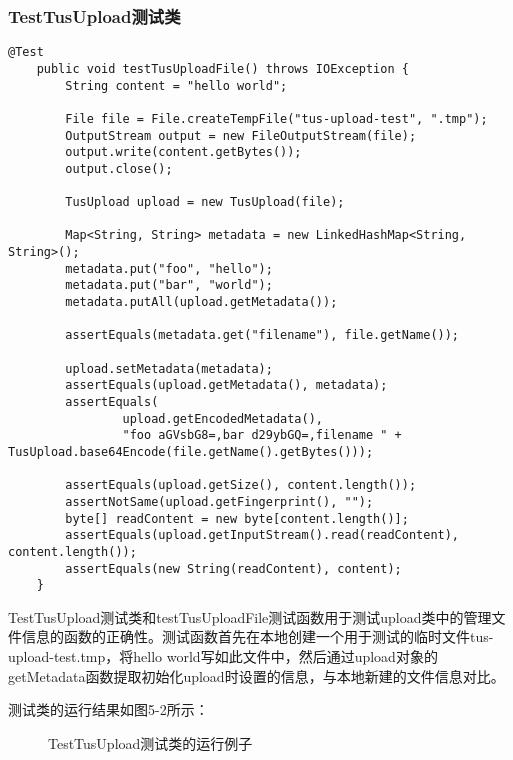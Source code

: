 \documentclass[bachelor]{thesis-uestc}
\begin{document}
\subsubsection{TestTusUpload测试类}
\begin{lstlisting}[title=testTusUploadFile测试函数]
    @Test
    public void testTusUploadFile() throws IOException {
        String content = "hello world";

        File file = File.createTempFile("tus-upload-test", ".tmp");
        OutputStream output = new FileOutputStream(file);
        output.write(content.getBytes());
        output.close();

        TusUpload upload = new TusUpload(file);

        Map<String, String> metadata = new LinkedHashMap<String, String>();
        metadata.put("foo", "hello");
        metadata.put("bar", "world");
        metadata.putAll(upload.getMetadata());

        assertEquals(metadata.get("filename"), file.getName());

        upload.setMetadata(metadata);
        assertEquals(upload.getMetadata(), metadata);
        assertEquals(
                upload.getEncodedMetadata(),
                "foo aGVsbG8=,bar d29ybGQ=,filename " + TusUpload.base64Encode(file.getName().getBytes()));

        assertEquals(upload.getSize(), content.length());
        assertNotSame(upload.getFingerprint(), "");
        byte[] readContent = new byte[content.length()];
        assertEquals(upload.getInputStream().read(readContent), content.length());
        assertEquals(new String(readContent), content);
	}
\end{lstlisting}
\par TestTusUpload测试类和testTusUploadFile测试函数用于测试upload类中的管理文件信息的函数的正确性。测试函数首先在本地创建一个用于测试的临时文件tus-upload-test.tmp，将hello world写如此文件中，然后通过upload对象的getMetadata函数提取初始化upload时设置的信息，与本地新建的文件信息对比。
\par 测试类的运行结果如图5-2所示：
\begin{figure}[h]
\caption{TestTusUpload测试类的运行例子}
\end{figure}
\end{document}
